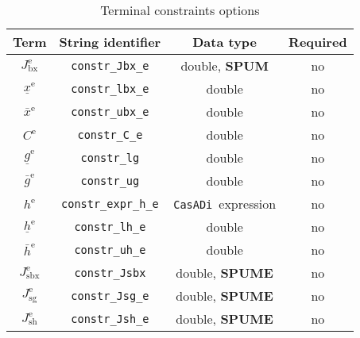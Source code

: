 \documentclass[english]{article}
\newcommand{\code}[1]{\texttt{#1}}
\newcommand{\casadi}{\texttt{CasADi}}
\newcommand{\ind}[1]{_{\textrm{#1}}}
\newcommand{\terminal}{^{\textrm{e}}}
\newcommand{\optional}{no}
\begin{document}
\begin{table}[ht!]
    \centering
    \caption{Terminal constraints options} \label{tab:constraints:terminal}
    \begin{tabular}{cccc}
        \toprule
        Term & String identifier & Data type & Required \\ \midrule
        $J\ind{bx}\terminal$ & \code{constr\_Jbx\_e}    & double, \textbf{SPUM}   & \optional   \\
        $\underline{x}\terminal $    & \code{constr\_lbx\_e}     & double  & \optional   \\
        $\bar{x}\terminal $         & \code{constr\_ubx\_e}     & double   & \optional  \\ [1em]
        $ C\terminal $ & \code{constr\_C\_e}    & double   & \optional   \\
        $\underline{g}\terminal $    & \code{constr\_lg}     & double   & \optional   \\
        $\bar{g}\terminal $         & \code{constr\_ug}     & double   & \optional  \\ [1em]
        $ h\terminal $ & \code{constr\_expr\_h\_e}    & \casadi~expression   & \optional  \\
        $\underline{h}\terminal $    & \code{constr\_lh\_e}     & double   & \optional   \\
        $\bar{h}\terminal $         & \code{constr\_uh\_e}     & double  & \optional   \\ [1em]
        $ J\ind{sbx}\terminal $ & \code{constr\_Jsbx} & double, \textbf{SPUME}   & \optional \\
        $ J\ind{sg}\terminal $ & \code{constr\_Jsg\_e} & double, \textbf{SPUME} & \optional  \\
        $ J\ind{sh}\terminal $ & \code{constr\_Jsh\_e} & double, \textbf{SPUME}  & \optional  \\
        \bottomrule
    \end{tabular}
\end{table}
%
%
\end{document}
